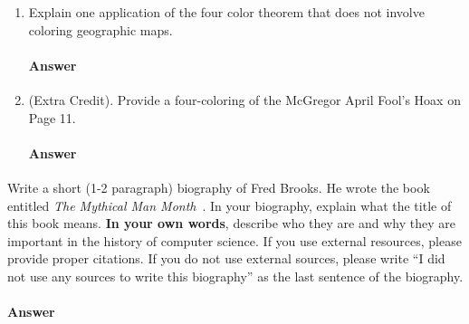 \documentclass{article}
\begin{document}
\begin{enumerate}
    \item Explain one application of the four color theorem that does not
        involve coloring geographic maps.

        \paragraph{Answer}

    \item (Extra Credit). Provide a four-coloring of the McGregor April Fool's
        Hoax on Page 11.

        \paragraph{Answer}

\end{enumerate}

\collab{\todo{}}

Write a short (1-2 paragraph) biography of Fred Brooks.  He wrote the book
entitled \emph{The Mythical Man Month}~\cite{brooks-manmonth}.  In your
biography, explain what the title of this book means.
\textbf{In your own words}, describe who they are and why they are important in
the history of computer science.  If you use external resources, please provide
proper citations. If you do not use external sources, please write ``I did not
use any sources to write this biography'' as the last sentence of the
biography.

\paragraph{Answer}


\newpage


\end{document}
